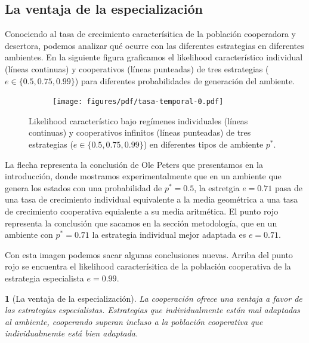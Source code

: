 \documentclass[a4paper,10pt]{article}
\newif\ifen
\newif\ifes
\newcommand{\en}[1]{\ifen#1\fi}
\newcommand{\es}[1]{\ifes#1\fi}
\newtheorem{conclution}{\en{Conclution}\es{Conclusión}}%
\begin{document}
\subsection{La ventaja de la especialización}

Conociendo al tasa de crecimiento caracterísitica de la población cooperadora y desertora, podemos analizar qué ocurre con las diferentes estrategias en diferentes ambientes.
En la siguiente figura graficamos el likelihood característico individual (líneas continuas) y cooperativos (líneas punteadas) de tres estrategias ($e \in \{0.5, 0.75, 0.99\}$) para diferentes probabilidades de generación del ambiente.
%
\begin{figure}[H]
    \centering
    \begin{subfigure}[b]{0.66\textwidth}
    \texttt{[image: figures/pdf/tasa-temporal-0.pdf]}
    \end{subfigure}
    \caption{Likelihood característico bajo regímenes individuales (líneas continuas) y cooperativos infinitos (líneas punteadas) de tres estrategias ($e \in \{0.5, 0.75, 0.99\}$) en diferentes tipos de ambiente $p^*$.}
    \label{fig:fitness_temporal}
\end{figure}
%
La flecha representa la conclusión de Ole Peters que presentamos en la introducción, donde mostramos experimentalmente que en un ambiente que genera los estados con una probabilidad de $p^* = 0.5$, la estretgia $e=0.71$ pasa de una tasa de crecimiento individual equivalente a la media geométrica a una tasa de crecimiento cooperativa equialente a su media aritmética.
El punto rojo representa la conclusión que sacamos en la sección metodología, que en un ambiente con $p^*=0.71$ la estrategia individual mejor adaptada es $e=0.71$.


Con esta imagen podemos sacar algunas conclusiones nuevas.
Arriba del punto rojo se encuentra el likelihood caracterísitica de la población cooperativa de la estrategia especialista $e=0.99$.

\begin{conclution}[La ventaja de la especialización]
La cooperación ofrece una ventaja a favor de las estrategias especialistas. Estrategias que individualmente están mal adaptadas al ambiente, cooperando superan incluso a la población cooperativa que individualmemte está bien adaptada.
\end{conclution}
\end{document}
